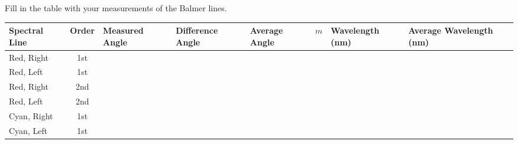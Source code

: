 \documentclass[addpoints]{physlabs}
\begin{document}
\begin{postlab}


    \filbreak
    \question[2] Fill in the table with your measurements of the Balmer lines.

    \begin{center}
        \renewcommand{\arraystretch}{2}
        \captionsetup{font=normalsize}
        \begin{tabular}{|p{2cm}|c|>{\centering\arraybackslash}p{1.8cm}|>{\centering\arraybackslash}p{1.8cm}|>{\centering\arraybackslash}p{1.8cm}|>{\centering\arraybackslash}p{0.8cm}|>{\centering\arraybackslash}p{1.8cm}|>{\centering\arraybackslash}p{2cm}|}
            \hline
            \rowcolor{gray!20}
            Spectral Line & Order & Measured Angle & Difference Angle & Average Angle     & $m$               & Wavelength (nm)   & \textbf{Average Wavelength (nm)} \\
            \hline
            Red, Right    & 1st   &                &                  & \multirow{2}{*}{} & \multirow{2}{*}{} & \multirow{2}{*}{} & \multirow{4}{*}{}                \\
            \cline{1-4}
            Red, Left     & 1st   &                &                  &                   &                   &                   &                                  \\
            \cline{1-7}
            Red, Right    & 2nd   &                &                  & \multirow{2}{*}{} & \multirow{2}{*}{} & \multirow{2}{*}{} &                                  \\
            \cline{1-4}
            Red, Left     & 2nd   &                &                  &                   &                   &                   &                                  \\
            \hline
            Cyan, Right   & 1st   &                &                  & \multirow{2}{*}{} & \multirow{2}{*}{} & \multirow{2}{*}{} & \multirow{4}{*}{}                \\
            \cline{1-4}
            Cyan, Left    & 1st   &                &                  &                   &                   &                   &                                  \\

\end{tabular}
\end{center}
\end{postlab}
\end{document}
